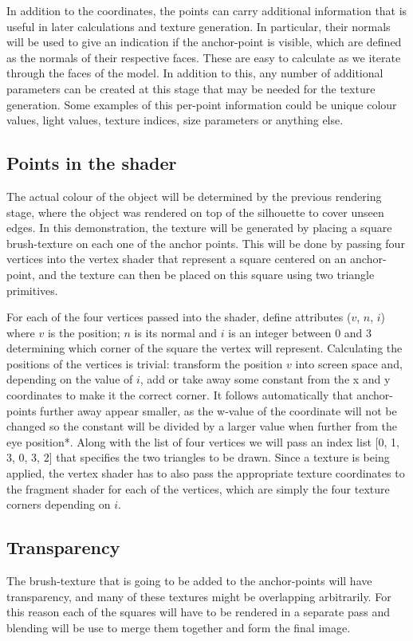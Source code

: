 \documentclass[a4paper, 12pt]{article}
\begin{document}
In addition to the coordinates, the points can carry additional information that is useful in later calculations and texture generation. In particular, their normals will be used to give an indication if the anchor-point is visible, which are defined as the normals of their respective faces. These are easy to calculate as we iterate through the faces of the model. In addition to this, any number of additional parameters can be created at this stage that may be needed for the texture generation. Some examples of this per-point information could be unique colour values, light values, texture indices, size parameters or anything else.


\subsection{Points in the shader}
The actual colour of the object will be determined by the previous rendering stage, where the object was rendered on top of the silhouette to cover unseen edges. In this demonstration, the texture will be generated by placing a square brush-texture on each one of the anchor points. This will be done by passing four vertices into the vertex shader that represent a square centered on an anchor-point, and the texture can then be placed on this square using two triangle primitives.

For each of the four vertices passed into the shader, define attributes ($v$, $n$, $i$) where $v$ is the position; $n$ is its normal and $i$ is an integer between 0 and 3 determining which corner of the square the vertex will represent. Calculating the positions of the vertices is trivial: transform the position $v$ into screen space and, depending on the value of $i$, add or take away some constant from the x and y coordinates to make it the correct corner. It follows automatically that anchor-points further away appear smaller, as the w-value of the coordinate will not be changed so the constant will be divided by a larger value when further from the eye position*. Along with the list of four vertices we will pass an index list [0, 1, 3, 0, 3, 2] that specifies the two triangles to be drawn. Since a texture is being applied, the vertex shader has to also pass the appropriate texture coordinates to the fragment shader for each of the vertices, which are simply the four texture corners depending on $i$.


\subsection{Transparency}
The brush-texture that is going to be added to the anchor-points will have transparency, and many of these textures might be overlapping arbitrarily. For this reason each of the squares will have to be rendered in a separate pass and blending will be use to merge them together and form the final image.
\end{document}
